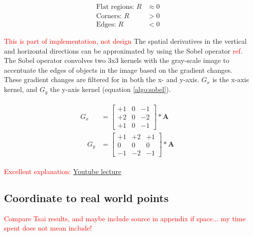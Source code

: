 \documentclass{article}
\newcommand{\rf}[1]{\textcolor{red}{#1}}
\begin{document}
\begin{align*}
    \text{Flat regions:   } R &\approx 0\\
    \text{Corners:   } R &>0 \\
    \text{Edges:   } R &< 0
\end{align*}


\rf{This is part of implementation, not design}
The spatial derivatives in the vertical and horizontal directions can be approximated by using the Sobel operator \rf{ref}.  The Sobel operator convolves two 3x3 kernels with the gray-scale image to accentuate the edges of objects in the image based on the gradient changes.  These gradient changes are filtered for in both the x- and y-axis.  $G_x$ is the x-axis kernel, and $G_y$ the y-axis kernel (equation \ref{algo:sobel}).


\begin{align}
    \begin{split} \label{algo:sobel}
    G_x&=\left[\begin{array}{lll}
        +1 & 0 & -1 \\
        +2 & 0 & -2 \\
        +1 & 0 & -1
        \end{array}\right] * \mathbf{A} \quad \\
    \quad G_y&=\left[\begin{array}{ccc}
        +1 & +2 & +1 \\
        0 & 0 & 0 \\
        -1 & -2 & -1
        \end{array}\right] * \mathbf{A}
    \end{split}
\end{align}

\rf{Excellent explanation: \href{https://www.youtube.com/watch?v=_qgKQGsuKeQ&t=2545s}{Youtube lecture}}





\subsection{Coordinate to real world points}

\rf{Compare Tsai results, and maybe include source in appendix if space... my time spent does not mean include!}
\end{document}
